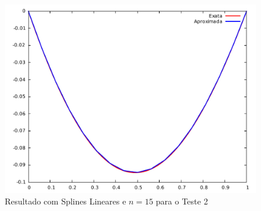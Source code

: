 \documentclass[12pt,a4paper]{report}
\begin{document}
\begin{figure}[t]
\centering
\includegraphics[width=0.8\linewidth]{t2splin15.pdf}
\caption{\label{splin}Resultado com Splines Lineares e $n=15$ para o Teste 2}
\end{figure}
\end{document}
